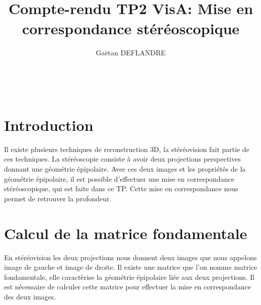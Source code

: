 \documentclass[a4paper,11pt]{article}
\title{
  \noindent\hrulefill \\
  \vspace{10mm} Compte-rendu TP2 VisA: Mise en correspondance stéréoscopique
}
\author{Gaëtan DEFLANDRE}
\begin{document}
\maketitle

\noindent\hrulefill \\


\section{Introduction}
Il existe plusieurs techniques de reconstruction 3D, la stéréovision fait partie de ces techniques.
La stéréoscopie consiste à avoir deux projections perspectives donnant une géométrie épipolaire. 
Avec ces deux images et les propriétés de la géométrie épipolaire, il est possible d'effectuer une 
mise en correspondance stéréoscopique, qui est faite dans ce TP. Cette mise en correspondance nous 
permet de retrouver la profondeur.\\

\newpage

\section{Calcul de la matrice fondamentale}

En stéréovision les deux projections nous donnent deux images que nous appelons image de gauche et 
image de droite. Il existe une matrice que l'on nomme matrice fondamentale, elle caractèrise la 
géométrie épipolaire liée aux deux projections. Il est nécessaire de calculer cette matrice pour 
effectuer la mise en correspondance des deux images.\\

\begin{figure}[H]
  \centering
\end{figure}
\end{document}
